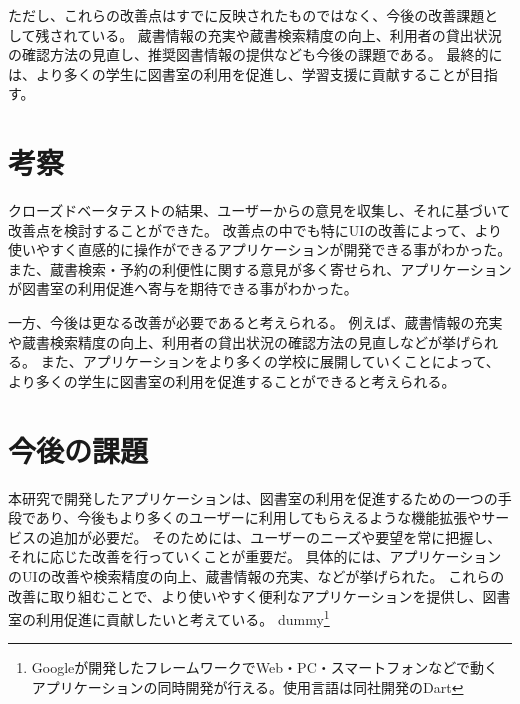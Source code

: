 \documentclass[twocolumn]{jsarticle}
\begin{document}
ただし、これらの改善点はすでに反映されたものではなく、今後の改善課題として残されている。
蔵書情報の充実や蔵書検索精度の向上、利用者の貸出状況の確認方法の見直し、推奨図書情報の提供なども今後の課題である。
最終的には、より多くの学生に図書室の利用を促進し、学習支援に貢献することが目指す。
\newpage
\section{考察}
クローズドベータテストの結果、ユーザーからの意見を収集し、それに基づいて改善点を検討することができた。
改善点の中でも特にUIの改善によって、より使いやすく直感的に操作ができるアプリケーションが開発できる事がわかった。
また、蔵書検索・予約の利便性に関する意見が多く寄せられ、アプリケーションが図書室の利用促進へ寄与を期待できる事がわかった。

一方、今後は更なる改善が必要であると考えられる。
例えば、蔵書情報の充実や蔵書検索精度の向上、利用者の貸出状況の確認方法の見直しなどが挙げられる。
また、アプリケーションをより多くの学校に展開していくことによって、より多くの学生に図書室の利用を促進することができると考えられる。
\section{今後の課題}
本研究で開発したアプリケーションは、図書室の利用を促進するための一つの手段であり、今後もより多くのユーザーに利用してもらえるような機能拡張やサービスの追加が必要だ。
そのためには、ユーザーのニーズや要望を常に把握し、それに応じた改善を行っていくことが重要だ。
具体的には、アプリケーションのUIの改善や検索精度の向上、蔵書情報の充実、などが挙げられた。
これらの改善に取り組むことで、より使いやすく便利なアプリケーションを提供し、図書室の利用促進に貢献したいと考えている。
\color{white}
dummy\footnote[1]{Googleが開発したフレームワークでWeb・PC・スマートフォンなどで動くアプリケーションの同時開発が行える。使用言語は同社開発のDart}
\end{document}
